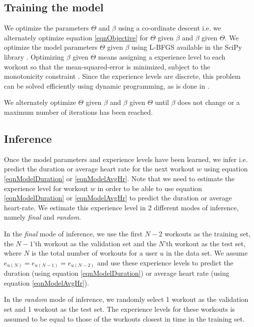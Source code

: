 \documentclass{acm_proc_article-sp}
\begin{document}
\subsection{Training the model}
We optimize the parameters $\Theta$ and $\beta$ using a co-ordinate descent \cite{coordinateDescentWiki} i.e. we alternately optimize equation \ref{eqnObjective} for $\Theta$ given $\beta$ and $\beta$ given $\Theta$. We optimize the model parameters $\Theta$ given $\beta$ using L-BFGS \cite{lbfgs} available in the SciPy library \cite{scipy}. Optimizing $\beta$ given $\Theta$ means assigning a experience level to each workout so that the mean-squared-error is minimized, subject to the monotonicity constraint \cite{www13}. Since the experience levels are discrete, this problem can be solved efficiently using dynamic programming, as is done in \cite{www13}.

We alternately optimize $\Theta$ given $\beta$ and $\beta$ given $\Theta$ until $\beta$ does not change or a maximum number of iterations has been reached.

\subsection{Inference}
Once the model parameters and experience levels have been learned, we infer i.e. predict the duration or average heart rate for the next workout $w$ using equation \ref{eqnModelDuration} or \ref{eqnModelAvgHr}. Note that we need to estimate the experience level for workout $w$ in order to be able to use equation \ref{eqnModelDuration} or \ref{eqnModelAvgHr} to predict the duration or average heart-rate. We estimate this experience level in 2 different modes of inference, namely \emph{final} and \emph{random}. 

In the \emph{final} mode of inference, we use the first $N-2$ workouts as the training set, the $N-1$'th workout as the validation set and the $N$'th workout as the test set, where $N$ is the total number of workouts for a user $u$ in the data set. We assume $e_{u(N)} = e_{u(N-1)} = e_{u(N-2)}$ and use these experience levels to predict the duration (using equation \ref{eqnModelDuration}) or average heart rate (using equation \ref{eqnModelAvgHr}).

In the \emph{random} mode of inference, we randomly select 1 workout as the validation set and 1 workout as the test set. The experience levels for these workouts is assumed to be equal to those of the workouts closest in time in the training set. 
\end{document}
